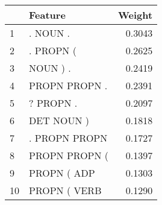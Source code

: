 \begin{tabular}{llr}
\toprule
{} &        Feature &  Weight \\
\midrule
1  &       . NOUN . &  0.3043 \\
2  &      . PROPN ( &  0.2625 \\
3  &       NOUN ) . &  0.2419 \\
4  &  PROPN PROPN . &  0.2391 \\
5  &      ? PROPN . &  0.2097 \\
6  &     DET NOUN ) &  0.1818 \\
7  &  . PROPN PROPN &  0.1727 \\
8  &  PROPN PROPN ( &  0.1397 \\
9  &    PROPN ( ADP &  0.1303 \\
10 &   PROPN ( VERB &  0.1290 \\
\bottomrule
\end{tabular}
